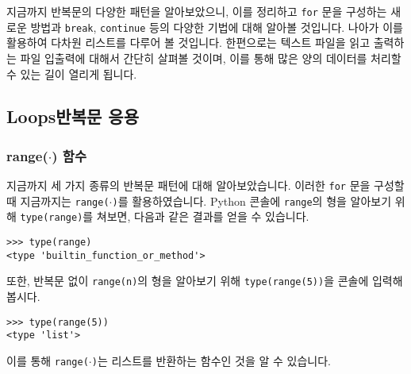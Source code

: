 \documentclass[../main.tex]{subfiles}
\begin{document}
지금까지 반복문의 다양한 패턴을 알아보았으니, 이를 정리하고 \texttt{for} 문을 구성하는 새로운 방법과 \texttt{break}, \texttt{continue} 등의 다양한 기법에 대해 알아볼 것입니다.
나아가 이를 활용하여 다차원 리스트를 다루어 볼 것입니다.
한편으로는 텍스트 파일을 읽고 출력하는 파일 입출력에 대해서 간단히 살펴볼 것이며, 이를 통해 많은 양의 데이터를 처리할 수 있는 길이 열리게 됩니다.

\subsection{Loops반복문 응용}
\subsubsection{range($\cdot$) 함수}
지금까지 세 가지 종류의 반복문 패턴에 대해 알아보았습니다.
이러한 \texttt{for} 문을 구성할 때 지금까지는 \texttt{range($\cdot$)}를 활용하였습니다.
Python 콘솔에 \texttt{range}의 형을 알아보기 위해 \texttt{type(range)}를 쳐보면, 다음과 같은 결과를 얻을 수 있습니다.
\begin{verbatim}
>>> type(range)
<type 'builtin_function_or_method'>
\end{verbatim}
또한, 반복문 없이 \texttt{range(n)}의 형을 알아보기 위해 \texttt{type(range(5))}을 콘솔에 입력해봅시다.
\begin{verbatim}
>>> type(range(5))
<type 'list'>
\end{verbatim}
이를 통해 \texttt{range($\cdot$)}는 리스트를 반환하는 함수인 것을 알 수 있습니다.
\end{document}
